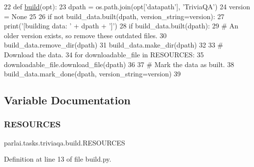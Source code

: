 \begin{DoxyCode}
22 \textcolor{keyword}{def }\hyperlink{namespacedialog__babi__feedback_1_1build_a7a9d289f7493a5ded13c4b7f071b6184}{build}(opt):
23     dpath = os.path.join(opt[\textcolor{stringliteral}{'datapath'}], \textcolor{stringliteral}{'TriviaQA'})
24     version = \textcolor{keywordtype}{None}
25 
26     \textcolor{keywordflow}{if} \textcolor{keywordflow}{not} build\_data.built(dpath, version\_string=version):
27         print(\textcolor{stringliteral}{'[building data: '} + dpath + \textcolor{stringliteral}{']'})
28         \textcolor{keywordflow}{if} build\_data.built(dpath):
29             \textcolor{comment}{# An older version exists, so remove these outdated files.}
30             build\_data.remove\_dir(dpath)
31         build\_data.make\_dir(dpath)
32 
33         \textcolor{comment}{# Download the data.}
34         \textcolor{keywordflow}{for} downloadable\_file \textcolor{keywordflow}{in} RESOURCES:
35             downloadable\_file.download\_file(dpath)
36 
37         \textcolor{comment}{# Mark the data as built.}
38         build\_data.mark\_done(dpath, version\_string=version)
39 \end{DoxyCode}


\subsection{Variable Documentation}
\mbox{\label{namespaceparlai_1_1tasks_1_1triviaqa_1_1build_ae7981e82f6d0b2f71930d438cda0cca9}} 
\subsubsection{\texorpdfstring{R\+E\+S\+O\+U\+R\+C\+ES}{RESOURCES}}
{\footnotesize\ttfamily parlai.\+tasks.\+triviaqa.\+build.\+R\+E\+S\+O\+U\+R\+C\+ES}



Definition at line 13 of file build.\+py.

